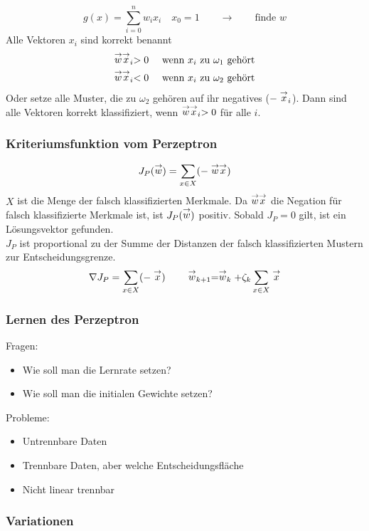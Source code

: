 $$g(x) = \sum\limits_{i=0}^n w_i x_i \quad x_0 = 1 \qquad \to \qquad \textrm{finde } w$$
Alle Vektoren $x_i$ sind korrekt benannt
\begin{eqnarray*}
\stackrel{\to}{w}\stackrel{\to}{x}_i > 0 && \textrm{ wenn } x_i \textrm{ zu } \omega_1 \textrm{ gehört} \\ \stackrel{\to}{w}\stackrel{\to}{x}_i < 0 && \textrm{ wenn } x_i \textrm{ zu } \omega_2 \textrm{ gehört}
\end{eqnarray*}
Oder setze alle Muster, die zu $\omega_2$ gehören auf ihr negatives ($-\stackrel{\to}{x}_i$). Dann sind alle Vektoren korrekt klassifiziert, wenn $\stackrel{\to}{w} \stackrel{\to}{x}_i > 0$ für alle $i$.
\subsubsection*{Kriteriumsfunktion vom Perzeptron}
$$J_P(\stackrel{\to}{w}) = \sum\limits_{x \in X} (- \stackrel{\to}{w} \stackrel{\to}{x})$$
$X$ ist die Menge der falsch klassifizierten Merkmale. Da $\stackrel{\to}{w} \stackrel{\to}{x}$ die Negation für falsch klassifizierte Merkmale ist, ist $J_P(\stackrel{\to}{w})$ positiv. Sobald $J_P = 0$ gilt, ist ein Lösungsvektor gefunden. \\ $J_P$ ist proportional zu der Summe der Distanzen der falsch klassifizierten Mustern zur Entscheidungsgrenze.
$$\nabla J_P = \sum\limits_{x \in X} (- \stackrel{\to}{x}) \qquad \stackrel{\to}{w}_{k+1} = \stackrel{\to}{w}_k + \zeta_k \sum\limits_{x \in X} \stackrel{\to}{x}$$

\subsubsection*{Lernen des Perzeptron}

Fragen:
\begin{itemize}
\item Wie soll man die Lernrate setzen?
\item Wie soll man die initialen Gewichte setzen?
\end{itemize}
Probleme:
\begin{itemize}
\item Untrennbare Daten
\item Trennbare Daten, aber welche Entscheidungsfläche
\item Nicht linear trennbar
\end{itemize}

\subsubsection*{Variationen}

